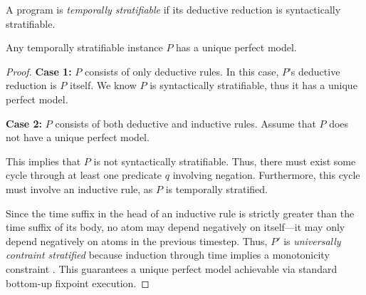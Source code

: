 \begin{definition} 
%
A \slang program is \emph{temporally stratifiable} if its deductive
reduction is syntactically stratifiable.
%
\end{definition}


\begin{lemma}
\label{lemma:temp-strat-uniq}
%
Any temporally stratifiable \slang instance $P$ has a unique perfect model.
%
\end{lemma} 

\begin{proof}
%
{\bf Case 1:} $P$ consists of only deductive rules.  In this case, $P$'s
deductive reduction is $P$ itself.  We know $P$ is syntactically stratifiable,
thus it has a unique perfect model.

{\bf Case 2:} $P$ consists of both deductive and inductive rules.  Assume that
$P$ does not have a unique perfect model.  

This implies that $P$ is not
syntactically stratifiable.  Thus, there must exist some cycle through at least
one predicate $q$ involving negation.
Furthermore, this cycle must involve an inductive rule, as $P$ is temporally
stratified.

Since the time suffix in the head of an inductive rule is strictly greater than
the time suffix of its body, no atom may depend negatively on itself---it may
only depend negatively on atoms in the previous timestep.  Thus, $P'$ is
{\em universally contraint stratified} because induction through time implies a
monotonicity constraint .  This guarantees a unique perfect model
achievable via standard bottom-up fixpoint execution.
%
%
\end{proof}


